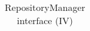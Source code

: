 \begin{table}[h!]
\begin{center}
\begin{tabular}{||r|l|l||}
		\end{tabular}
		\caption{\label{table:rm-interface-4} RepositoryManager interface (IV)}
	\end{center}
\end{table}